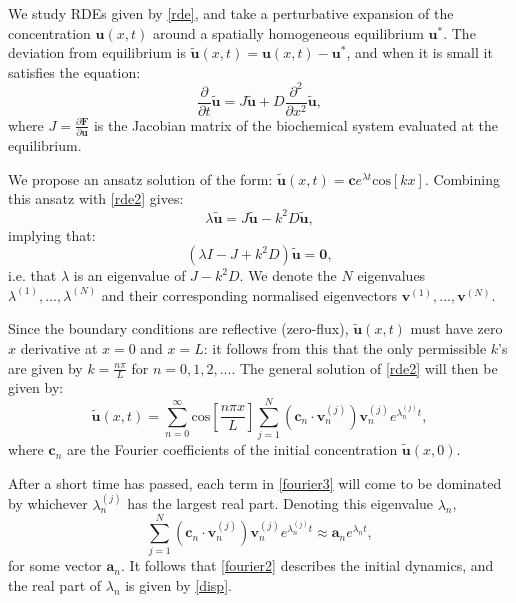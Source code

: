 We study RDEs given by \eqref{rde}, and take a perturbative expansion of the concentration $\mathbf{u}(x,t)$ around a spatially homogeneous equilibrium $\mathbf{u}^*$. The deviation from equilibrium is $\tilde{\mathbf{u}}(x,t)=\mathbf{u}(x,t)-\mathbf{u}^*$, and when it is small it satisfies the equation:
\begin{equation}\label{rde2}
\frac{\partial}{\partial t} \tilde{\mathbf{u}}=J\tilde{\mathbf{u}}+D\frac{\partial^2}{\partial x^2} \tilde{\mathbf{u}},
\end{equation}
where $J=\frac{\partial \mathbf{F}}{\partial \mathbf{u}}$ is the Jacobian matrix of the biochemical system evaluated at the equilibrium. 

We propose an ansatz solution of the form: $\tilde{\mathbf{u}}(x,t)=\mathbf{c}e^{\lambda t}\text{cos}\left[kx\right]$. Combining this ansatz with \eqref{rde2} gives:
\begin{equation}\label{rde3}
\lambda \tilde{\mathbf{u}}=J\tilde{\mathbf{u}}-k^2D\tilde{\mathbf{u}},
\end{equation}
implying that:
\begin{equation}
\left( \lambda I -J+k^2D \right)\tilde{\mathbf{u}}=\mathbf{0},
\end{equation}
i.e. that $\lambda$ is an eigenvalue of $J-k^2D$. We denote the $N$ eigenvalues $\lambda^{(1)},...,\lambda^{(N)}$ and their corresponding normalised eigenvectors $\mathbf{v}^{(1)},...,\mathbf{v}^{(N)}$.

Since the boundary conditions are reflective (zero-flux), $\tilde{\mathbf{u}}(x,t)$ must have zero $x$ derivative at $x=0$ and $x=L$: it follows from this that the only permissible $k$'s are given by $k=\frac{n\pi}{L}$ for $n=0,1,2,...$. The general solution of \eqref{rde2} will then be given by:
\begin{equation}\label{fourier3}
\tilde{\mathbf{u}}(x,t)=\sum_{n=0}^\infty \text{cos}\left[\frac{n\pi x}{L}\right]  \sum_{j=1}^N \left(\mathbf{c}_n\cdot \mathbf{v}_n^{(j)}\right)\mathbf{v}_n^{(j)}e^{\lambda_n^{(j)}t},
\end{equation}
where $\mathbf{c}_n$ are the Fourier coefficients of the initial concentration $\tilde{\mathbf{u}}(x,0)$. 

After a short time has passed, each term in \eqref{fourier3} will come to be dominated by whichever $\lambda_n^{(j)}$ has the largest real part. Denoting this eigenvalue $\lambda_n$,
\begin{equation}
\sum_{j=1}^N \left(\mathbf{c}_n\cdot \mathbf{v}_n^{(j)}\right)\mathbf{v}_n^{(j)}e^{\lambda_n^{(j)}t}\approx \mathbf{a}_ne^{\lambda_n t},
\end{equation}
for some vector $\mathbf{a}_n$. It follows that \eqref{fourier2} describes the initial dynamics, and the real part of $\lambda_n$ is given by \eqref{disp}.